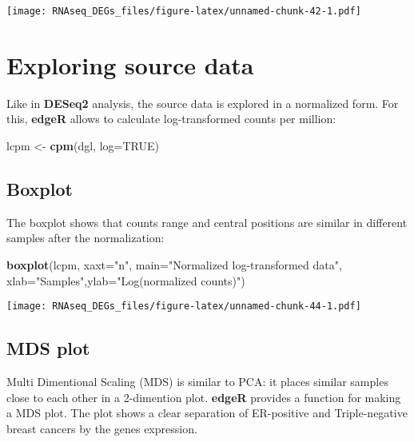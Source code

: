 \documentclass[]{book}
\newenvironment{Shaded}{\begin{snugshade}}{\end{snugshade}}
\newcommand{\KeywordTok}[1]{\textcolor[rgb]{0.13,0.29,0.53}{\textbf{#1}}}
\newcommand{\DataTypeTok}[1]{\textcolor[rgb]{0.13,0.29,0.53}{#1}}
\newcommand{\StringTok}[1]{\textcolor[rgb]{0.31,0.60,0.02}{#1}}
\newcommand{\OtherTok}[1]{\textcolor[rgb]{0.56,0.35,0.01}{#1}}
\newcommand{\NormalTok}[1]{#1}
\begin{document}
\texttt{[image: RNAseq\_DEGs\_files/figure-latex/unnamed-chunk-42-1.pdf]}

\section{Exploring source data}\label{exploring-source-data-1}

Like in \textbf{DESeq2} analysis, the source data is explored in a
normalized form. For this, \textbf{edgeR} allows to calculate
log-transformed counts per million:

\begin{Shaded}
\begin{Highlighting}[]
\NormalTok{lcpm <-}\StringTok{ }\KeywordTok{cpm}\NormalTok{(dgl, }\DataTypeTok{log=}\OtherTok{TRUE}\NormalTok{)}
\end{Highlighting}
\end{Shaded}

\subsection{Boxplot}\label{boxplot}

The boxplot shows that counts range and central positions are similar in
different samples after the normalization:

\begin{Shaded}
\begin{Highlighting}[]
\KeywordTok{boxplot}\NormalTok{(lcpm, }\DataTypeTok{xaxt=}\StringTok{"n"}\NormalTok{, }\DataTypeTok{main=}\StringTok{"Normalized log-transformed data"}\NormalTok{,}
        \DataTypeTok{xlab=}\StringTok{"Samples"}\NormalTok{,}\DataTypeTok{ylab=}\StringTok{"Log(normalized counts)"}\NormalTok{)}
\end{Highlighting}
\end{Shaded}

\texttt{[image: RNAseq\_DEGs\_files/figure-latex/unnamed-chunk-44-1.pdf]}

\subsection{MDS plot}\label{mds-plot}

Multi Dimentional Scaling (MDS) is similar to PCA: it places similar
samples close to each other in a 2-dimention plot. \textbf{edgeR}
provides a function for making a MDS plot. The plot shows a clear
separation of ER-positive and Triple-negative breast cancers by the
genes expression.
\end{document}
